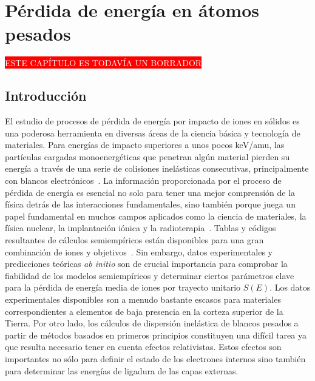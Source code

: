 \chapter{Pérdida de energía en átomos pesados}
\label{chap:heavy}

\begin{center}
\colorbox{red}{\textcolor{white}{ESTE CAPÍTULO ES TODAVÍA UN BORRADOR}}
\end{center}

\section{Introducción}
\label{sec:intro}

El estudio de procesos de pérdida de energía por impacto de iones 
en sólidos es una poderosa herramienta en diversas áreas de la ciencia
básica y tecnología de materiales. Para energías de impacto superiores 
a unos pocos keV/amu, las partículas cargadas monoenergéticas que 
penetran algún material pierden su energía a través de una serie de 
colisiones inelásticas consecutivas, principalmente con blancos
electrónicos~\cite{Chu:01,Sigmund:06}. La información proporcionada por 
el proceso de pérdida de energía es esencial no solo para tener una 
mejor comprensión de la física detrás de las interacciones fundamentales, 
sino también porque juega un papel fundamental en muchos campos 
aplicados como la ciencia de materiales, la física nuclear, la 
implantación iónica y la radioterapia~\cite{Sigmund:06,Schardt:10}. 
Tablas y códigos resultantes de cálculos semiempíricos están disponibles 
para una gran combinación de iones y objetivos~\cite{iaea_codes,Paul:03}. 
Sin embargo, datos experimentales y predicciones teóricas 
\textit{ab initio} son de crucial importancia para comprobar la 
fiabilidad de los modelos semiempíricos y determinar ciertos 
parámetros clave~\cite{Diwan:15,Damache:04,Damache:02} para la pérdida 
de energía media de iones por trayecto unitario $S(E)$. Los datos 
experimentales disponibles son a menudo bastante escasos para materiales 
correspondientes a elementos de baja presencia en la corteza superior de 
la Tierra. Por otro lado, los cálculos de dispersión inelástica de 
blancos pesados a partir de métodos basados en primeros principios 
constituyen una difícil tarea ya que resulta necesario tener en cuenta 
efectos relativistas. Estos efectos son importantes no sólo para definir 
el estado de los electrones internos sino también para determinar las 
energías de ligadura de las capas externas.

